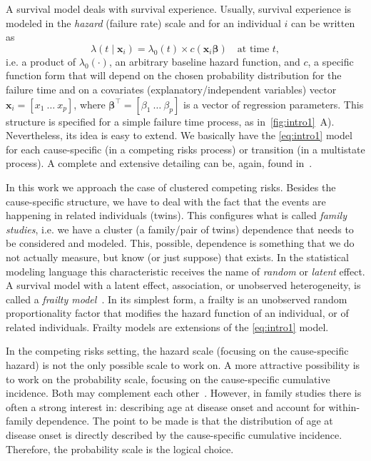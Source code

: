A survival model deals with survival experience. Usually, survival
experience is modeled in the \textit{hazard} (failure rate) scale and
for an individual \(i\) can be written as
\begin{equation}
  \lambda(t \mid \mathbf{x}_{i}) =
  \lambda_{0}(t) \times c(\bm{x}_{i} \bm{\beta})
  \quad \text{at time } t,
  \label{eq:intro1}
\end{equation}
i.e. a product of \(\lambda_{0}(\cdot)\), an arbitrary baseline hazard
function, and \(c\), a specific function form that will depend on the
chosen probability distribution for the failure time and on a covariates
(explanatory/independent variables) vector \(\bm{x}_{i} =
[x_{1}~\dots~x_{p}]\), where \(\bm{\beta}^{\top} =
[\beta_{1}~\dots~\beta_{p}]\) is a vector of regression parameters. This
structure is specified for a simple failure time process, as
in~\autoref{fig:intro1}~A). Nevertheless, its idea is easy to extend. We
basically have the \autoref{eq:intro1} model for each cause-specific (in
a competing risks process) or transition (in a multistate process). A
complete and extensive detailing can be, again, found
in~.

In this work we approach the case of clustered competing risks. Besides
the cause-specific structure, we have to deal with the fact that the
events are happening in related individuals (twins). This configures
what is called \textit{family studies}, i.e. we have a cluster (a
family/pair of twins) dependence that needs to be considered and
modeled. This, possible, dependence is something that we do not actually
measure, but know (or just suppose) that exists. In the statistical
modeling language this characteristic receives the name of
\textit{random} or \textit{latent} effect. A survival model with a
latent effect, association, or unobserved heterogeneity, is called a
\textit{frailty model}~\cite{frailty78, frailty79}. In its simplest
form, a frailty is an unobserved random proportionality factor that
modifies the hazard function of an individual, or of related
individuals. Frailty models are extensions of the \autoref{eq:intro1}
model.

In the competing risks setting, the hazard scale (focusing on the
cause-specific hazard) is not the only possible scale to work on. A more
attractive possibility is to work on the probability scale, focusing on
the cause-specific cumulative incidence. Both may complement each
other~\cite{andersen12}. However, in family studies there is often a
strong interest in: describing age at disease onset and account for
within-family dependence. The point to be made is that the distribution
of age at disease onset is directly described by the cause-specific
cumulative incidence. Therefore, the probability scale is the logical
choice.

